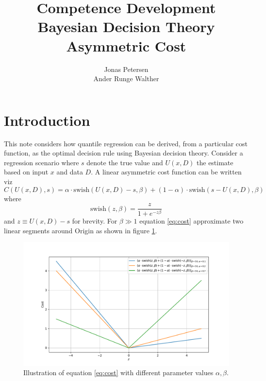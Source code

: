 \documentclass[a4paper,11pt, oneside]{article}
\theoremstyle{definition}
\begin{document}
	
	
	\begin{titlepage}
		\title{\small{Competence Development}\\
			\huge{Bayesian Decision Theory Asymmetric Cost}
		}
		\author{Jonas Petersen \\ Ander Runge Walther }
		\date{} %
		\maketitle
		\thispagestyle{empty}
	\end{titlepage}
	
	\newpage
	\tableofcontents

	\thispagestyle{plain}
	
	
	\section{Introduction}
	This note considers how quantile regression can be derived, from a particular cost function, as the optimal decision rule using Bayesian decision theory. Consider a regression scenario where $s$ denote the true value and $U(x,D)$ the estimate based on input $x$ and data $D$. A linear asymmetric cost function can be written viz
	\begin{equation}
		C(U(x,D), s) = \alpha\cdot \text{swish}(U(x,D)-s,\beta)+(1-\alpha)\cdot\text{swish}(s-U(x,D),\beta)
		\label{eq:cost}
	\end{equation}
	where
	\begin{equation}
		\text{swish}(z,\beta) = \frac{z}{1+e^{-z\beta}}
	\end{equation}
	and $z\equiv U(x,D)-s$ for brevity. For $\beta\gg 1 $ equation \eqref{eq:cost} approximate two linear segments around Origin as shown in figure \ref{fig:1}.
	\begin{figure}[H]
		\centering
		\includegraphics[width = 1\textwidth]{figures/cost_plot.pdf}
		\caption{Illustration of equation \eqref{eq:cost} with different parameter values $\alpha,\beta$.}
		\label{fig:1}
	\end{figure}
\end{document}
